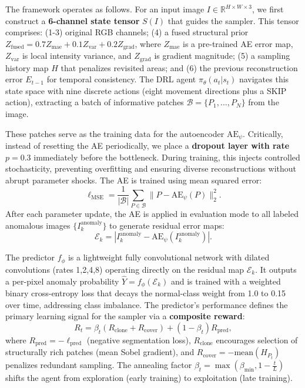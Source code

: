 \documentclass[twoside]{article}
\begin{document}
The framework operates as follows. For an input image \( I \in \mathbb{R}^{H\times W\times 3} \), we first construct a \textbf{6-channel state tensor} \( S(I) \) that guides the sampler. This tensor comprises: (1-3) original RGB channels; (4) a fused structural prior \( Z_{\text{fused}} = 0.7 Z_{\text{mae}} + 0.1 Z_{\text{var}} + 0.2 Z_{\text{grad}} \), where \( Z_{\text{mae}} \) is a pre-trained AE error map, \( Z_{\text{var}} \) is local intensity variance, and \( Z_{\text{grad}} \) is gradient magnitude; (5) a sampling history map \( H \) that penalizes revisited areas; and (6) the previous reconstruction error \( E_{t-1} \) for temporal consistency. The DRL agent \( \pi_\theta(a_t | s_t) \) navigates this state space with nine discrete actions (eight movement directions plus a SKIP action), extracting a batch of informative patches \( \mathcal{B} = \{P_1,\ldots,P_N\} \) from the image.

These patches serve as the training data for the autoencoder \( \text{AE}_\psi \). Critically, instead of resetting the AE periodically, we place a \textbf{dropout layer with rate \( p=0.3 \)} immediately before the bottleneck. During training, this injects controlled stochasticity, preventing overfitting and ensuring diverse reconstructions without abrupt parameter shocks. The AE is trained using mean squared error:
\[
\ell_{\text{MSE}} = \frac{1}{|\mathcal{B}|} \sum_{P\in \mathcal{B}} \| P - \text{AE}_\psi(P) \|_2^2.
\]
After each parameter update, the AE is applied in evaluation mode to all labeled anomalous images \( \{I_k^{\text{anomaly}}\} \) to generate residual error maps:
\[
\mathcal{E}_k = | I_k^{\text{anomaly}} - \text{AE}_\psi(I_k^{\text{anomaly}}) |.
\]

The predictor \( f_\phi \) is a lightweight fully convolutional network with dilated convolutions (rates 1,2,4,8) operating directly on the residual map \( \mathcal{E}_k \). It outputs a per-pixel anomaly probability \( \hat{Y} = f_\phi(\mathcal{E}_k) \) and is trained with a weighted binary cross-entropy loss that decays the normal-class weight from 1.0 to 0.15 over time, addressing class imbalance. The predictor's performance defines the primary learning signal for the sampler via a \textbf{composite reward}:
\[
R_t = \beta_t (R_{\text{clone}} + R_{\text{cover}}) + (1-\beta_t) R_{\text{pred}},
\]
where \( R_{\text{pred}} = -\ell_{\text{pred}} \) (negative segmentation loss), \( R_{\text{clone}} \) encourages selection of structurally rich patches (mean Sobel gradient), and \( R_{\text{cover}} = -\text{mean}(H_{P_t}) \) penalizes redundant sampling. The annealing factor \( \beta_t = \max(\beta_{\min}, 1 - \frac{t}{L}) \) shifts the agent from exploration (early training) to exploitation (late training).
\end{document}
